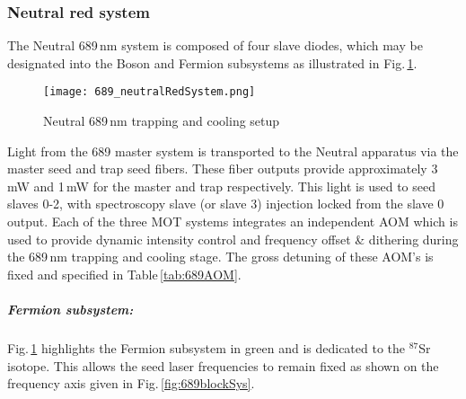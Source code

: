%
%


\subsubsection{Neutral red system}
The Neutral 689\,nm system is composed of four slave diodes, which may be designated into the Boson and Fermion subsystems as illustrated in Fig.\,\ref{fig:neutralRed}.
	\begin{figure} 
		\centerline{
		\texttt{[image: 689\_neutralRedSystem.png]}}
		\caption{Neutral 689\,nm trapping and cooling setup}{}
		\label{fig:neutralRed}
	\end{figure}
Light from the 689 master system is transported to the Neutral apparatus via the master seed and trap seed fibers.
These fiber outputs provide approximately 3\,mW and 1\,mW for the master and trap respectively.
This light is used to seed slaves 0-2, with spectroscopy slave (or slave 3) injection locked from the slave 0 output.
Each of the three MOT systems integrates an independent AOM which is used to provide dynamic intensity control and frequency offset \& dithering during the 689\,nm trapping and cooling stage.
The gross detuning of these AOM's is fixed and specified in Table\,\ref{tab:689AOM}.

\subparagraph{Fermion subsystem:}
Fig.\,\ref{fig:neutralRed} highlights the Fermion subsystem in green and is dedicated to the $^{87}$Sr isotope.
This allows the seed laser frequencies to remain fixed as shown on the frequency axis given in Fig.\,\ref{fig:689blockSys}.


